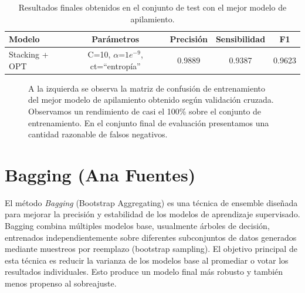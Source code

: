 \documentclass[12pt,letterpaper]{article}
\begin{document}
\begin{table}[htp]
    \centering
    \begin{tabular}{lcccc}
        \hline
        \textbf{Modelo} & \textbf{Parámetros} &\textbf{Precisión} &\textbf{Sensibilidad} &\textbf{F1} \\\hline
        Stacking + OPT & C=10, $\alpha$=$1e^{-9}$, ct=``entropía'' & 0.9889 & 0.9387 & 0.9623\\ 
        \hline
    \end{tabular}
    \caption{Resultados finales obtenidos en el conjunto de test con el mejor modelo de apilamiento.}
    \label{tab:StackingFinalResults}
\end{table}

\begin{figure}[htp]
\centering
{}
\caption{A la izquierda se observa la matriz de confusión de entrenamiento del mejor modelo de apilamiento obtenido según validación cruzada. Observamos un rendimiento de casi el 100\% sobre el conjunto de entrenamiento.
En el conjunto final de evaluación presentamos una cantidad razonable de falsos negativos.}
\label{fig:StackingMatrix}
\end{figure}


\section{Bagging (Ana Fuentes)}

El método \textit{Bagging} (Bootstrap Aggregating) es una técnica de ensemble diseñada para mejorar la precisión y estabilidad de los modelos de aprendizaje supervisado. Bagging combina múltiples modelos base, usualmente árboles de decisión, entrenados independientemente sobre diferentes subconjuntos de datos generados mediante muestreos por reemplazo (bootstrap sampling). El objetivo principal de esta técnica es reducir la varianza de los modelos base al promediar o votar los resultados individuales. Esto produce un modelo final más robusto y también menos propenso al sobreajuste.
\end{document}
